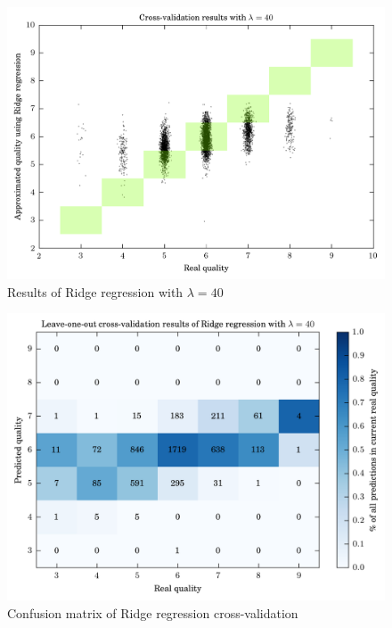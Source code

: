 \documentclass[notitlepage]{report}
\begin{document}
\begin{figure}
\includegraphics[width=\textwidth]{cv_scatters/reg_40.png}
\caption{Results of Ridge regression with $\lambda=40$}
\label{tbl:reg-scatter}
\end{figure}

\begin{figure}
\includegraphics[width=\textwidth]{40-reg-heatmap.png}
\caption{Confusion matrix of Ridge regression cross-validation}
\label{tbl:reg-conf}
\end{figure}
\end{document}
